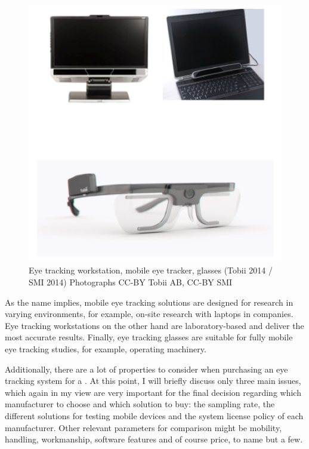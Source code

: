 \documentclass[output=paper]{langsci/langscibook}
\begin{document}
 
\begin{figure}[t]
 \includegraphics[width=.6\textwidth]{figures/Roesener3.png}
 \caption{Eye tracking workstation, mobile eye tracker,  glasses (Tobii 2014 / SMI 2014) {\scriptsize Photographs CC-BY Tobii AB, CC-BY SMI}}
 \label{roesener:fig:3}
\end{figure} 


As the name implies, mobile eye tracking solutions are designed for research in varying environments, for example, on-site research with laptops in companies. Eye tracking workstations on the other hand are laboratory-based and deliver the most accurate results. Finally, eye tracking glasses are suitable for fully mobile eye tracking studies, for example, operating machinery.


Additionally, there are a lot of properties to consider when purchasing an eye tracking system for a . At this point, I will briefly discuss only three main issues, which again in my view are very important for the final decision regarding which manufacturer to choose and which solution to buy: the sampling rate, the different solutions for testing mobile devices and the system license policy of each manufacturer. Other relevant parameters for comparison might be mobility, handling, workmanship, software features and of course price, to name but a few. 
\end{document}
